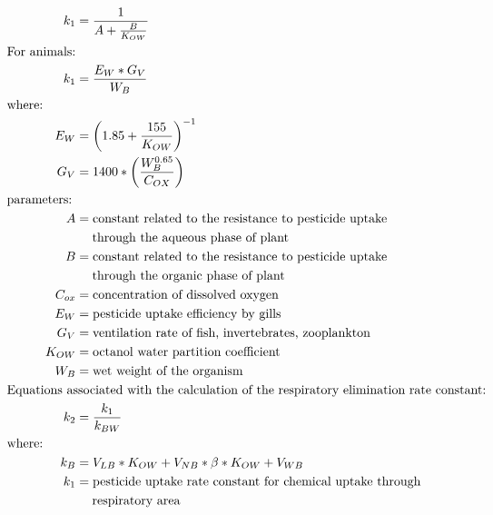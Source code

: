 \documentclass[10pt]{article}
\begin{document}
\begin{align*}
k_{1} & = \frac{1}{A +\frac{B}{K_{OW}}} \nonumber \\
&    \hspace{-.750in}  \text{For animals:} \nonumber \\
k_{1} & = \frac{E_{W}*G_{V}}{W_{B}} \nonumber \\
&    \hspace{-.75in}  \text{where:} \nonumber \\
E_{W} & = \left(1.85+\frac{155}{K_{OW}}\right)^{-1} \nonumber \\
G_{V} & = 1400 * \left(\frac{W_{B}^{0.65}}{C_{OX}}\right) \nonumber \\
&    \hspace{-.75in}  \text{parameters:} \nonumber \\
A & = \text{constant related to the resistance to pesticide uptake}\nonumber \\ &\hspace{1.3em} \text{through the aqueous phase of plant} \nonumber \\
B & = \text{constant related to the resistance to pesticide uptake}\nonumber \\ &\hspace{1.3em} \text{through the organic phase of plant} \nonumber \\
C_{ox} & = \text{concentration of dissolved oxygen} \nonumber\\
E_{W} & = \text{pesticide uptake efficiency by gills} \nonumber\\
G_{V} & = \text{ventilation rate of fish, invertebrates, zooplankton} \nonumber\\
K_{OW} & = \text{octanol water partition coefficient} \nonumber\\
W_{B} & = \text{wet weight of the organism} \nonumber\\
&    \hspace{-.75in}  \text{Equations associated with the calculation of the respiratory elimination rate constant:} \nonumber \\
k_{2} & = \frac{k_{1}}{k_{BW}} \nonumber \\
&    \hspace{-.75in}  \text{where:} \nonumber \\
k_{B} & = V_{LB}*K_{OW}+V_{NB}*\beta*K_{OW}+V_{WB} \nonumber \\
k_{1} & = \text{pesticide uptake rate constant for chemical uptake through}\nonumber \\ &\hspace{1.3em} \text{respiratory area} \nonumber\\

\end{align*}
\end{document}

